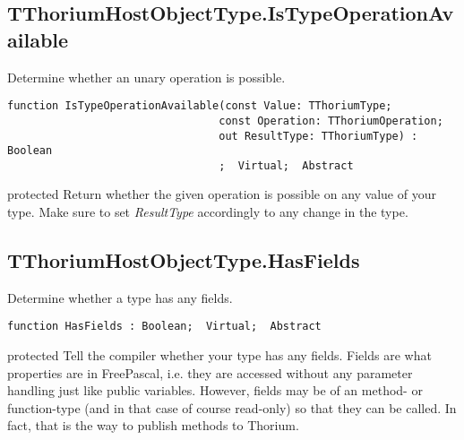 \subsection{TThoriumHostObjectType.IsTypeOperationAvailable}
\label{thoriumcorepkg:thorium:tthoriumhostobjecttype:istypeoperationavailable}
\begin{FPCList}
\Synopsis
Determine whether an unary operation is possible.\Declaration 

\begin{verbatim}
function IsTypeOperationAvailable(const Value: TThoriumType;
                                 const Operation: TThoriumOperation;
                                 out ResultType: TThoriumType) : Boolean
                                 ;  Virtual;  Abstract
\end{verbatim}
\Visibility
protected
\Description
Return whether the given operation is possible on any value of your type. Make sure to set \textit{ResultType} accordingly to any change in the type.\end{FPCList}
\subsection{TThoriumHostObjectType.HasFields}
\label{thoriumcorepkg:thorium:tthoriumhostobjecttype:hasfields}
\begin{FPCList}
\Synopsis
Determine whether a type has any fields.\Declaration 

\begin{verbatim}
function HasFields : Boolean;  Virtual;  Abstract
\end{verbatim}
\Visibility
protected
\Description
Tell the compiler whether your type has any fields. Fields are what properties are in FreePascal, i.e. they are accessed without any parameter handling just like public variables. However, fields may be of an method- or function-type (and in that case of course read-only) so that they can be called. In fact, that is the way to publish methods to Thorium.\end{FPCList}
